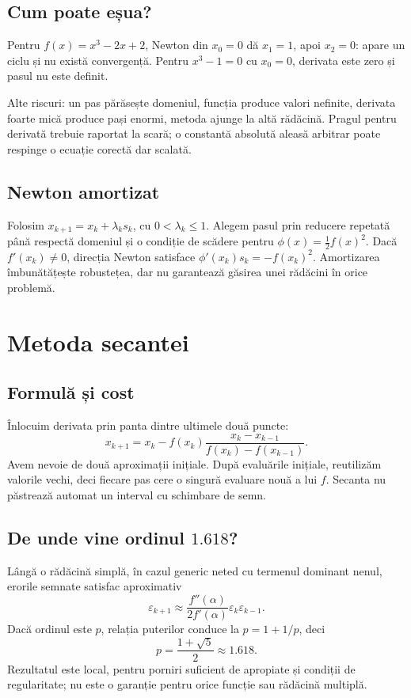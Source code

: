 \documentclass[11pt,a4paper]{article}
\begin{document}
\subsection{Cum poate eșua?}
Pentru $f(x)=x^3-2x+2$, Newton din $x_0=0$ dă $x_1=1$, apoi $x_2=0$: apare un ciclu și nu există convergență. Pentru $x^3-1=0$ cu $x_0=0$, derivata este zero și pasul nu este definit.

Alte riscuri: un pas părăsește domeniul, funcția produce valori nefinite, derivata foarte mică produce pași enormi, metoda ajunge la altă rădăcină. Pragul pentru derivată trebuie raportat la scară; o constantă absolută aleasă arbitrar poate respinge o ecuație corectă dar scalată.

\subsection{Newton amortizat}
Folosim $x_{k+1}=x_k+\lambda_k s_k$, cu $0<\lambda_k\le1$. Alegem pasul prin reducere repetată până respectă domeniul și o condiție de scădere pentru $\phi(x)=\tfrac12f(x)^2$. Dacă $f'(x_k)\ne0$, direcția Newton satisface $\phi'(x_k)s_k=-f(x_k)^2$. Amortizarea îmbunătățește robustețea, dar nu garantează găsirea unei rădăcini în orice problemă.

\section{Metoda secantei}
\subsection{Formulă și cost}
Înlocuim derivata prin panta dintre ultimele două puncte:
\[
x_{k+1}=x_k-f(x_k)\frac{x_k-x_{k-1}}{f(x_k)-f(x_{k-1})}.
\]
Avem nevoie de două aproximații inițiale. După evaluările inițiale, reutilizăm valorile vechi, deci fiecare pas cere o singură evaluare nouă a lui $f$. Secanta nu păstrează automat un interval cu schimbare de semn.

\subsection{De unde vine ordinul $1.618$?}
Lângă o rădăcină simplă, în cazul generic neted cu termenul dominant nenul, erorile semnate satisfac aproximativ
\[
\varepsilon_{k+1}\approx\frac{f''(\alpha)}{2f'(\alpha)}
\varepsilon_k\varepsilon_{k-1}.
\]
Dacă ordinul este $p$, relația puterilor conduce la $p=1+1/p$, deci
\[
p=\frac{1+\sqrt5}{2}\approx1.618.
\]
Rezultatul este local, pentru porniri suficient de apropiate și condiții de regularitate; nu este o garanție pentru orice funcție sau rădăcină multiplă.
\end{document}

